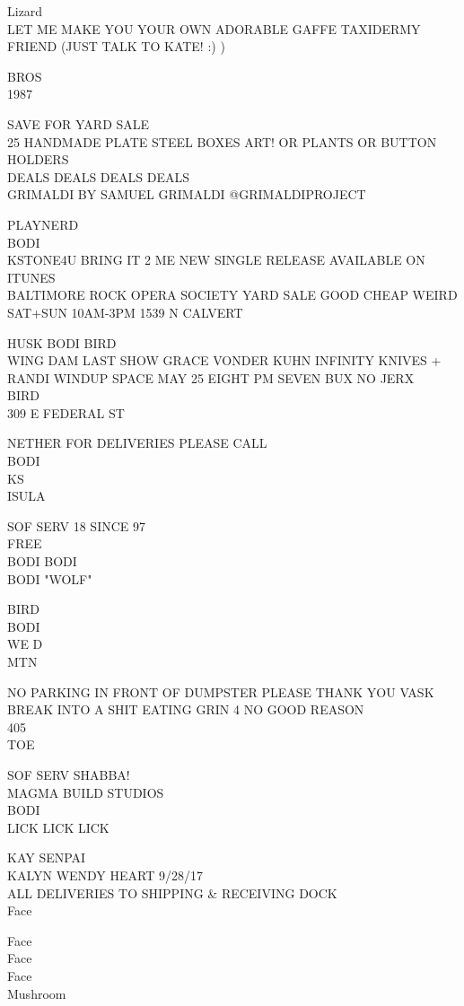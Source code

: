 \documentclass[10pt,letterpaper]{article}
\begin{document}
Lizard\\
LET ME MAKE YOU YOUR OWN ADORABLE GAFFE TAXIDERMY FRIEND (JUST TALK TO KATE! :) )

BROS\\
1987

SAVE FOR YARD SALE\\
25 HANDMADE PLATE STEEL BOXES ART!  OR PLANTS OR BUTTON HOLDERS\\
DEALS DEALS DEALS DEALS\\
GRIMALDI BY SAMUEL GRIMALDI @GRIMALDIPROJECT

PLAYNERD\\
BODI\\
KSTONE4U BRING IT 2 ME NEW SINGLE RELEASE AVAILABLE ON ITUNES\\
BALTIMORE ROCK OPERA SOCIETY YARD SALE GOOD CHEAP WEIRD SAT+SUN 10AM{-}3PM 1539 N CALVERT

HUSK BODI BIRD\\
WING DAM LAST SHOW GRACE VONDER KUHN INFINITY KNIVES + RANDI WINDUP SPACE MAY 25 EIGHT PM SEVEN BUX NO JERX\\
BIRD\\
309 E FEDERAL ST

NETHER FOR DELIVERIES PLEASE CALL\\
BODI\\
KS\\
ISULA

SOF SERV 18 SINCE 97\\
FREE\\
BODI BODI\\
BODI "WOLF"

BIRD\\
BODI\\
WE D\\
MTN

NO PARKING IN FRONT OF DUMPSTER PLEASE THANK YOU VASK\\
BREAK INTO A SHIT EATING GRIN 4 NO GOOD REASON\\
405\\
TOE

SOF SERV SHABBA!\\
MAGMA BUILD STUDIOS\\
BODI\\
LICK LICK LICK

KAY SENPAI\\
KALYN WENDY HEART 9/28/17\\
ALL DELIVERIES TO SHIPPING \& RECEIVING DOCK\\
Face

Face\\
Face\\
Face\\
Mushroom
\end{document}
